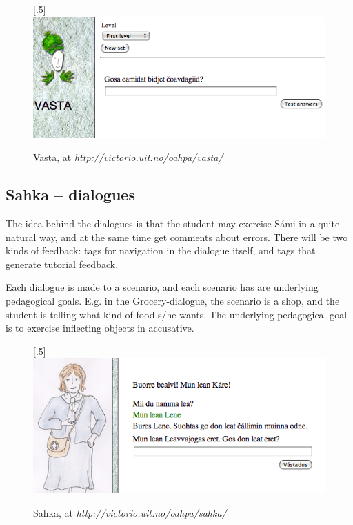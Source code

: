 \documentclass[a4paper,12pt]{article}
\begin{document}
\begin{figure}[htbp]
\begin{center}
\scalebox{.5}[.5]{\includegraphics{img/vasta.png}}\\
\caption{Vasta, at \textit{http://victorio.uit.no/oahpa/vasta/}}
\label{vasta}
\end{center}
\end{figure}

	

\subsection{Sahka -- dialogues}
The idea behind the dialogues is that the student may exercise Sámi in a quite natural way, and at the same time get comments about errors. There will be two kinds of feedback: tags for navigation in the dialogue itself, and tags that generate tutorial feedback.

Each dialogue is made to a scenario, and each scenario has are underlying pedagogical goals. E.g. in the Grocery-dialogue, the scenario is a shop, and the student is telling what kind of food s/he wants. The underlying pedagogical goal is to exercise inflecting objects in accusative.

\begin{figure}[htbp]
\begin{center}
\scalebox{.5}[.5]{\includegraphics{img/sahka2.png}}\\
\caption{Sahka, at \textit{http://victorio.uit.no/oahpa/sahka/}}
\label{sahka}
\end{center}
\end{figure}
\end{document}
